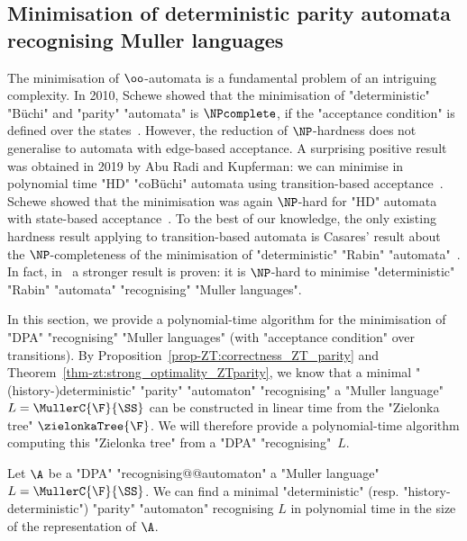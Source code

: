 \documentclass{theoretics}
\begin{document}
\subsection{Minimisation of deterministic parity automata recognising Muller languages}\label{subsec-corollaries: minimisation-parity}
The minimisation of $\oo$-automata is a fundamental problem of an intriguing complexity. In 2010, Schewe showed that the minimisation of "deterministic" "B\"uchi" and "parity" "automata" is $\NPcomplete$, if the "acceptance condition" is defined over the states~\cite{Schewe10MinimisingNPComplete}. However, the reduction of $\NP$-hardness does not generalise to automata with edge-based acceptance. A surprising positive result was obtained in 2019 by Abu Radi and Kupferman: we can minimise in polynomial time "HD" "coB\"uchi" automata using transition-based acceptance~\cite{AK22MinimizingGFG}. Schewe showed that the minimisation was again $\NP$-hard for "HD" automata with state-based acceptance~\cite{Schewe20MinimisingGFG}. To the best of our knowledge, the only existing hardness result applying to transition-based automata is Casares' result about the $\NP$-completeness of the minimisation of "deterministic" "Rabin" "automata"~\cite{Casares2021Chromatic}. In fact, in~\cite{Casares2021Chromatic} a stronger result is proven: it is $\NP$-hard to minimise "deterministic" "Rabin" "automata" "recognising" "Muller languages".

In this section, we provide a polynomial-time algorithm for the minimisation of "DPA" "recognising" "Muller languages" (with "acceptance condition" over transitions). By Proposition~\ref{prop-ZT:correctness_ZT_parity} and Theorem~\ref{thm-zt:strong_optimality_ZTparity}, we know that a minimal "(history-)deterministic" "parity" "automaton" "recognising" a "Muller language" $L = \MullerC{\F}{\SS}$ can be constructed in linear time from the "Zielonka tree" $\zielonkaTree{\F}$. %
We will therefore provide a polynomial-time algorithm computing this "Zielonka tree" from a "DPA" "recognising"~$L$.

\begin{theorem}\label{thm-min:minimisation_parity_automata}
	Let $\A$ %
	be a "DPA"  "recognising@@automaton" a "Muller language" $L = \MullerC{\F}{\SS}$. We can find a minimal "deterministic" (resp. "history-deterministic") "parity" "automaton" recognising $L$ in polynomial time in the size of the representation of $\A$.\footnotemark{}
\end{theorem}
\end{document}
